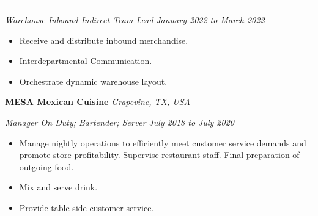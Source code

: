 \documentclass[10pt, a4paper]{article}
\newcommand{\rangesep}{to\xspace}  %
\renewcommand{\date}[1]{\textit{#1}}
\newcommand{\location}[1]{\textit{#1}}
\newcommand{\heading}[1]{
    \makebox[0pt][l]{\Large \sc \hspace{2pt}#1}
    \rule[-0.7ex]{\columnwidth}{0.5pt}\vspace{1.0ex}
}
\newcommand{\subheading}[1]{{\bfseries #1}}
\newcommand{\subheadSkip}{\vspace{0.7ex}}
\newenvironment{mysection}[1]
{\vspace{2.5ex}
\heading{#1}
\begin{adjustwidth}{0.3cm}{0cm}}
{\end{adjustwidth} }
\begin{document}
\begin{mysection}{Employment}
        \vspace{0.1ex}
        \textit{Warehouse Inbound Indirect Team Lead} \hfill \date{January 2022 \rangesep March 2022}
        \begin{itemize}
            \item Receive and distribute inbound merchandise. 
            \item Interdepartmental Communication.
            \item Orchestrate dynamic warehouse layout.
        \end{itemize}

        \subheadSkip
        \subheading{MESA Mexican Cuisine} \hfill \location{Grapevine, TX, USA}

        \textit{Manager On Duty; Bartender; Server} \hfill \date{July 2018 \rangesep July 2020}

        \begin{itemize}
            \item Manage nightly operations to efficiently meet customer service demands and promote store profitability. Supervise restaurant staff. Final preparation of outgoing food.
            \item Mix and serve drink.
            \item Provide table side customer service.
        \end{itemize}
    \end{mysection}
\end{document}
